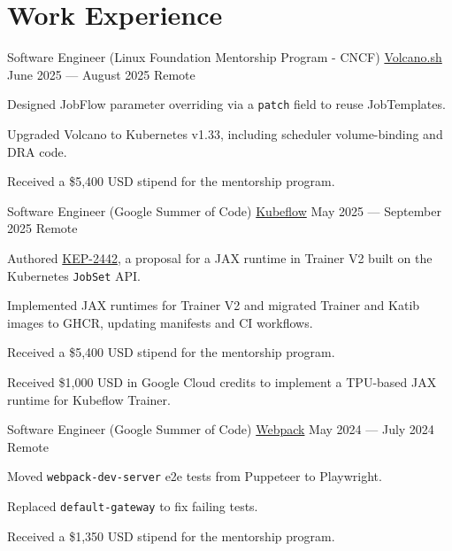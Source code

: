 \documentclass[letterpaper]{resume_config}
\newcommand{\code}[1]{\colorbox{light-gray}{\texttt{#1}}}
\begin{document}
\vspace{-6pt}

\section{Work Experience}

\WorkExperience
    {Software Engineer (Linux Foundation Mentorship Program - CNCF)} %
    {\href{https://volcano.sh/}{Volcano.sh}} %
    {June 2025 --- August 2025} %
    {Remote} %
    {
        \item Designed JobFlow parameter overriding via a \code{patch} field to reuse JobTemplates.
        \item Upgraded Volcano to Kubernetes v1.33, including scheduler volume-binding and DRA code.
        \item Received a \$5,400 USD stipend for the mentorship program.
    }

\WorkExperience
    {Software Engineer (Google Summer of Code)} %
    {\href{https://www.kubeflow.org/}{Kubeflow}} %
    {May 2025 --- September 2025} %
    {Remote} %
    {
        \item Authored \href{https://github.com/kubeflow/trainer/tree/master/proposals/2442-jax-runtime-trainer-v2}{KEP-2442}, a proposal for a JAX runtime in Trainer V2 built on the Kubernetes \code{JobSet} API.
        \item Implemented JAX runtimes for Trainer V2 and migrated Trainer and Katib images to GHCR, updating manifests and CI workflows.
        \item Received a \$5,400 USD stipend for the mentorship program.
        \item Received \$1,000 USD in Google Cloud credits to implement a TPU-based JAX runtime for Kubeflow Trainer.
    }

\WorkExperience
    {Software Engineer (Google Summer of Code)} %
    {\href{https://webpack.js.org/}{Webpack}} %
    {May 2024 --- July 2024} %
    {Remote} %
    {
        \item Moved \code{webpack-dev-server} e2e tests from Puppeteer to Playwright.
        \item Replaced \code{default-gateway} to fix failing tests.
        \item Received a \$1,350 USD stipend for the mentorship program.
    }
\end{document}
